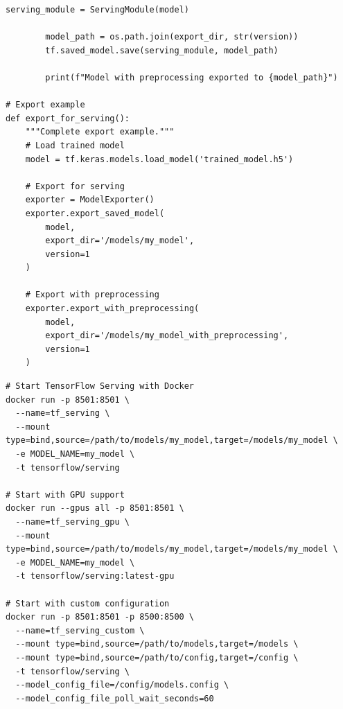 \begin{lstlisting}[style=python, caption=Prepare model for TensorFlow Serving]
        serving_module = ServingModule(model)

        model_path = os.path.join(export_dir, str(version))
        tf.saved_model.save(serving_module, model_path)

        print(f"Model with preprocessing exported to {model_path}")

# Export example
def export_for_serving():
    """Complete export example."""
    # Load trained model
    model = tf.keras.models.load_model('trained_model.h5')

    # Export for serving
    exporter = ModelExporter()
    exporter.export_saved_model(
        model,
        export_dir='/models/my_model',
        version=1
    )

    # Export with preprocessing
    exporter.export_with_preprocessing(
        model,
        export_dir='/models/my_model_with_preprocessing',
        version=1
    )
\end{lstlisting}

\begin{lstlisting}[style=shell, caption=TensorFlow Serving deployment with Docker]
# Start TensorFlow Serving with Docker
docker run -p 8501:8501 \
  --name=tf_serving \
  --mount type=bind,source=/path/to/models/my_model,target=/models/my_model \
  -e MODEL_NAME=my_model \
  -t tensorflow/serving

# Start with GPU support
docker run --gpus all -p 8501:8501 \
  --name=tf_serving_gpu \
  --mount type=bind,source=/path/to/models/my_model,target=/models/my_model \
  -e MODEL_NAME=my_model \
  -t tensorflow/serving:latest-gpu

# Start with custom configuration
docker run -p 8501:8501 -p 8500:8500 \
  --name=tf_serving_custom \
  --mount type=bind,source=/path/to/models,target=/models \
  --mount type=bind,source=/path/to/config,target=/config \
  -t tensorflow/serving \
  --model_config_file=/config/models.config \
  --model_config_file_poll_wait_seconds=60
\end{lstlisting}

